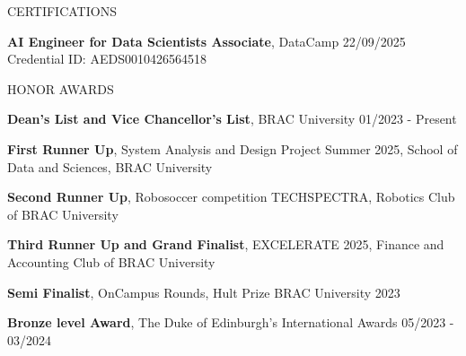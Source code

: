 \documentclass{resume} %
\begin{document}

\begin{rSection}{CERTIFICATIONS}
\vspace{-1.25em}
\item \textbf{AI Engineer for Data Scientists Associate}, DataCamp \hfill 22/09/2025\\
Credential ID: AEDS0010426564518
\end{rSection}


\begin{rSection}{HONOR AWARDS}
\vspace{-1.25em}
\item \textbf{Dean's List and Vice Chancellor's List}, BRAC University \hfill 01/2023 - Present
\item \textbf{First Runner Up}, System Analysis and Design Project Summer 2025, School of Data and Sciences, BRAC University
\item \textbf{Second Runner Up}, Robosoccer competition TECHSPECTRA, Robotics Club of BRAC University
\item \textbf{Third Runner Up and Grand Finalist}, EXCELERATE 2025, Finance and Accounting Club of BRAC University
\item \textbf{Semi Finalist}, OnCampus Rounds, Hult Prize BRAC University 2023
\item \textbf{Bronze level Award}, The Duke of Edinburgh's International Awards \hfill 05/2023 - 03/2024
\end{rSection}





\end{document}

